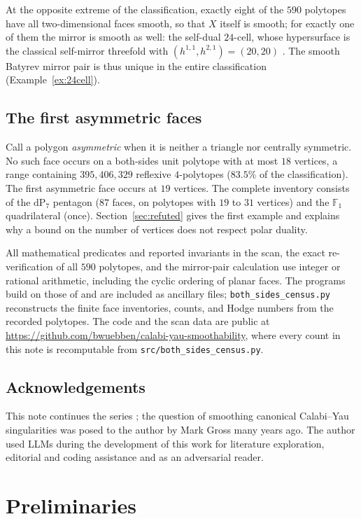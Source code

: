 \documentclass[11pt]{amsart}
\theoremstyle{definition}
\theoremstyle{remark}
\newcommand{\FF}{\mathbb{F}}
\begin{document}
At the opposite extreme of the classification, exactly eight of the $590$ polytopes have all two-dimensional faces smooth,
so that $X$ itself is smooth; for exactly one of them the mirror is smooth
as well: the self-dual $24$-cell, whose hypersurface is the classical
self-mirror threefold with $(h^{1,1},h^{2,1}) = (20,20)$ \cite{Braun12}.
The smooth Batyrev mirror pair is thus unique in the entire
classification (Example~\ref{ex:24cell}).

\subsection*{The first asymmetric faces}
Call a polygon \emph{asymmetric} when it is neither a triangle nor
centrally symmetric.  No such face occurs
on a both-sides unit polytope with at most $18$ vertices, a range
containing $395{,}406{,}329$ reflexive $4$-polytopes
($83.5\%$ of the classification).  The first asymmetric face occurs at
$19$ vertices.  The complete inventory consists of the $\mathrm{dP}_7$
pentagon ($87$ faces, on polytopes with $19$ to $31$ vertices) and the
$\FF_1$ quadrilateral (once).  Section~\ref{sec:refuted} gives the first
example and explains why a bound on the number of vertices does not
respect polar duality.

All mathematical predicates and reported invariants in the scan, the exact
re-verification of all $590$ polytopes, and the mirror-pair calculation use
integer or rational arithmetic, including the cyclic ordering of planar
faces.  The programs build on those of
\cite{paper1} and are included as ancillary files;
\texttt{both\_sides\_census.py} reconstructs the finite face inventories,
counts, and Hodge numbers from the recorded polytopes.  The
code and the scan data are public at
\url{https://github.com/bwuebben/calabi-yau-smoothability}, where every
count in this note is recomputable from
\texttt{src/both\_sides\_census.py}.

\subsection*{Acknowledgements}
This note continues the series \cite{paper1,paper2}; the question of
smoothing canonical Calabi--Yau singularities was posed to the author by
Mark Gross many years ago.
The author used LLMs during the development of this work for literature exploration, editorial and coding assistance and as an adversarial reader.

\section{Preliminaries}\label{sec:prelim}
\end{document}
